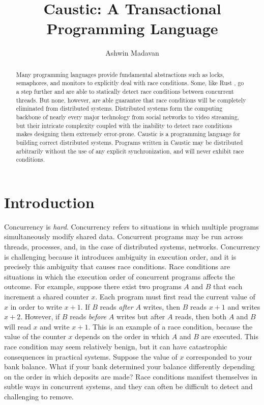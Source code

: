 \documentclass[12pt]{article}
\begin{document}
\title{Caustic: A Transactional Programming Language}
\author{Ashwin Madavan}
\maketitle

\begin{abstract}
Many programming languages provide fundamental abstractions such as locks, semaphores, and monitors
to explicitly deal with race conditions. Some, like Rust \cite{rust}, go a step further and are able
to statically detect race conditions between concurrent threads. But none, however, are able
guarantee that race conditions will be completely eliminated from distributed systems. Distributed
systems form the computing backbone of nearly every major technology from social networks to video
streaming, but their intricate complexity coupled with the inability to detect race conditions makes
designing them extremely error-prone. Caustic is a programming language for building correct
distributed systems. Programs written in Caustic may be distributed arbitrarily without the use of
any explicit synchronization, and will never exhibit race conditions.
\end{abstract}

\section{Introduction}
Concurrency is \emph{hard}. Concurrency refers to situations in which multiple programs
simultaneously modify shared data. Concurrent programs may be run across threads, processes,
and, in the case of distributed systems, networks. Concurrency is challenging because it introduces
ambiguity in execution order, and it is precisely this ambiguity that causes race conditions. Race
conditions are situations in which the execution order of concurrent programs affects the outcome.
For example, suppose there exist two programs $A$ and $B$ that each increment a shared counter $x$.
Each program must first read the current value of $x$ in order to write $x + 1$. If $B$ reads
\emph{after} $A$ writes, then $B$ reads $x + 1$ and writes $x + 2$. However, if $B$ reads
\emph{before} $A$ writes but after $A$ reads, then both $A$ and $B$ will read $x$ and write $x + 1$.
This is an example of a race condition, because the value of the counter $x$ depends on the order in
which $A$ and $B$ are executed. This race condition may seem relatively benign, but it can have
catastrophic consequences in practical systems. Suppose the value of $x$ corresponded to your bank
balance. What if your bank determined your balance differently depending on the order in which
deposits are made? Race conditions manifest themselves in subtle ways in concurrent systems, and
they can often be difficult to detect and challenging to remove.
\end{document}
